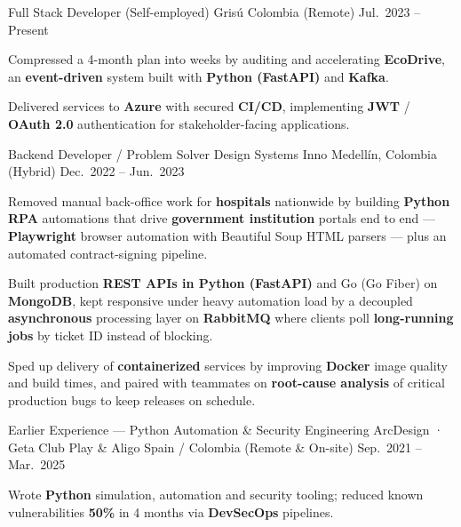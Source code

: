 \begin{cventries}
  \cventry
  {Full Stack Developer (Self-employed)}
  {Grisú}
  {Colombia (Remote)}
  {Jul.\ 2023 -- Present}
  {
    \begin{cvitems}
      \item {Compressed a 4-month plan into weeks by auditing and accelerating \textbf{EcoDrive}, an \textbf{event-driven} system built with \textbf{Python (FastAPI)} and \textbf{Kafka}.}
      \item {Delivered services to \textbf{Azure} with secured \textbf{CI/CD}, implementing \textbf{JWT} / \textbf{OAuth 2.0} authentication for stakeholder-facing applications.}
    \end{cvitems}
  }

  \cventry
  {Backend Developer / Problem Solver}
  {Design Systems Inno}
  {Medellín, Colombia (Hybrid)}
  {Dec.\ 2022 -- Jun.\ 2023}
  {
    \begin{cvitems}
      \item {Removed manual back-office work for \textbf{hospitals} nationwide by building \textbf{Python RPA} automations that drive \textbf{government institution} portals end to end --- \textbf{Playwright} browser automation with Beautiful Soup HTML parsers --- plus an automated contract-signing pipeline.}
      \item {Built production \textbf{REST APIs in Python (FastAPI)} and Go (Go Fiber) on \textbf{MongoDB}, kept responsive under heavy automation load by a decoupled \textbf{asynchronous} processing layer on \textbf{RabbitMQ} where clients poll \textbf{long-running jobs} by ticket ID instead of blocking.}
      \item {Sped up delivery of \textbf{containerized} services by improving \textbf{Docker} image quality and build times, and paired with teammates on \textbf{root-cause analysis} of critical production bugs to keep releases on schedule.}
    \end{cvitems}
  }

  \cventry
  {Earlier Experience --- Python Automation \& Security Engineering}
  {ArcDesign · Geta Club Play \& Aligo}
  {Spain / Colombia (Remote \& On-site)}
  {Sep.\ 2021 -- Mar.\ 2025}
  {
    \begin{cvitems}
      \item {Wrote \textbf{Python} simulation, automation and security tooling; reduced known vulnerabilities \textbf{50\%} in 4 months via \textbf{DevSecOps} pipelines.}
    \end{cvitems}
  }

\end{cventries}

